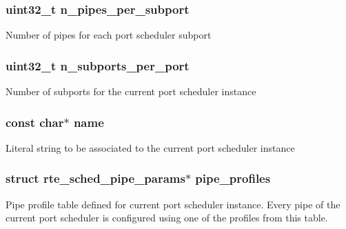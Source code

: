 \subsubsection[{n\+\_\+pipes\+\_\+per\+\_\+subport}]{\setlength{\rightskip}{0pt plus 5cm}uint32\+\_\+t n\+\_\+pipes\+\_\+per\+\_\+subport}\label{structrte__sched__port__params_ab560ed2b4d276da9403539787fd2ecad}
Number of pipes for each port scheduler subport \hypertarget{structrte__sched__port__params_a5fc7f8b94ee9fb392269ab69deb56a67}{}
\subsubsection[{n\+\_\+subports\+\_\+per\+\_\+port}]{\setlength{\rightskip}{0pt plus 5cm}uint32\+\_\+t n\+\_\+subports\+\_\+per\+\_\+port}\label{structrte__sched__port__params_a5fc7f8b94ee9fb392269ab69deb56a67}
Number of subports for the current port scheduler instance \hypertarget{structrte__sched__port__params_a8f8f80d37794cde9472343e4487ba3eb}{}
\subsubsection[{name}]{\setlength{\rightskip}{0pt plus 5cm}const char$\ast$ name}\label{structrte__sched__port__params_a8f8f80d37794cde9472343e4487ba3eb}
Literal string to be associated to the current port scheduler instance \hypertarget{structrte__sched__port__params_a516d68d24b2f41e9737502fbf2097db5}{}
\subsubsection[{pipe\+\_\+profiles}]{\setlength{\rightskip}{0pt plus 5cm}struct {\bf rte\+\_\+sched\+\_\+pipe\+\_\+params}$\ast$ pipe\+\_\+profiles}\label{structrte__sched__port__params_a516d68d24b2f41e9737502fbf2097db5}
Pipe profile table defined for current port scheduler instance. Every pipe of the current port scheduler is configured using one of the profiles from this table. \hypertarget{structrte__sched__port__params_a98277794202bfdf78db8bca71abaa98c}{}
